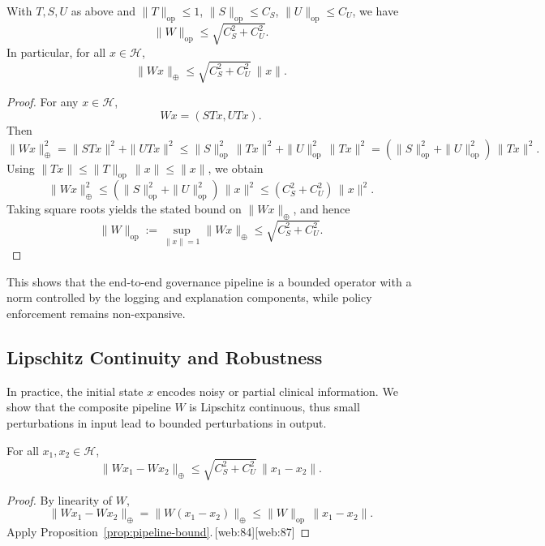 \documentclass[11pt]{article}
\begin{document}
\begin{proposition}
\label{prop:pipeline-bound}
With $T, S, U$ as above and $\|T\|_{\mathrm{op}} \le 1$, $\|S\|_{\mathrm{op}} \le C_S$, $\|U\|_{\mathrm{op}} \le C_U$, we have
\[
  \|W\|_{\mathrm{op}} \le \sqrt{C_S^2 + C_U^2}.
\]
In particular, for all $x \in \mathcal{H}$,
\[
  \|W x\|_{\oplus} \le \sqrt{C_S^2 + C_U^2} \, \|x\|.
\]
\end{proposition}

\begin{proof}
For any $x \in \mathcal{H}$,
\[
  W x = (S T x, U T x).
\]
Then
\[
  \|W x\|_{\oplus}^2 = \|S T x\|^2 + \|U T x\|^2
  \le \|S\|_{\mathrm{op}}^2 \, \|T x\|^2 + \|U\|_{\mathrm{op}}^2 \, \|T x\|^2
  = (\|S\|_{\mathrm{op}}^2 + \|U\|_{\mathrm{op}}^2) \, \|T x\|^2.
\]
Using $\|T x\| \le \|T\|_{\mathrm{op}} \, \|x\| \le \|x\|$, we obtain
\[
  \|W x\|_{\oplus}^2 \le (\|S\|_{\mathrm{op}}^2 + \|U\|_{\mathrm{op}}^2) \, \|x\|^2
  \le (C_S^2 + C_U^2) \, \|x\|^2.
\]
Taking square roots yields the stated bound on $\|W x\|_{\oplus}$, and hence
\[
  \|W\|_{\mathrm{op}} := \sup_{\|x\| = 1} \|W x\|_{\oplus} \le \sqrt{C_S^2 + C_U^2}.
\]
\end{proof}

This shows that the end-to-end governance pipeline is a bounded operator with a norm controlled by the logging and explanation components, while policy enforcement remains non-expansive.

\subsection{Lipschitz Continuity and Robustness}

In practice, the initial state $x$ encodes noisy or partial clinical information. 
We show that the composite pipeline $W$ is Lipschitz continuous, thus small perturbations in input lead to bounded perturbations in output.

\begin{corollary}
\label{cor:lipschitz}
For all $x_1, x_2 \in \mathcal{H}$,
\[
  \|W x_1 - W x_2\|_{\oplus} \le \sqrt{C_S^2 + C_U^2} \, \|x_1 - x_2\|.
\]
\end{corollary}

\begin{proof}
By linearity of $W$,
\[
  \|W x_1 - W x_2\|_{\oplus} = \|W (x_1 - x_2)\|_{\oplus}
  \le \|W\|_{\mathrm{op}} \, \|x_1 - x_2\|.
\]
Apply Proposition~\ref{prop:pipeline-bound}.\,[web:84][web:87]
\end{proof}
\end{document}
